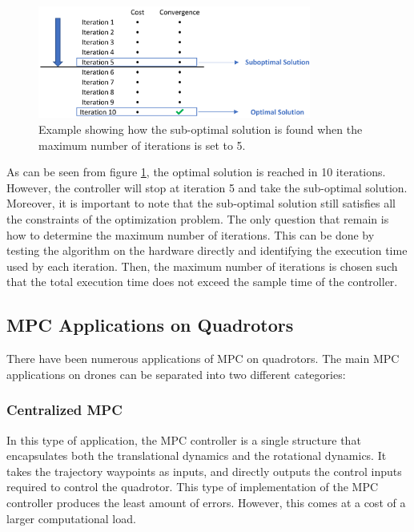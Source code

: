 \documentclass{thesisreport}
\begin{document}
\begin{figure}[h]
\centering
\includegraphics[width=0.8\textwidth]{Images/Control/Suboptimal_Solution.png}
\caption{Example showing how the sub-optimal solution is found when the maximum number of iterations is set to 5.}
\label{Suboptimal_solution_example}
\end{figure}

\noindent As can be seen from figure \ref{Suboptimal_solution_example}, the optimal solution is reached in 10 iterations. However, the controller will stop at iteration 5 and take the sub-optimal solution. Moreover, it is important to note that the sub-optimal solution still satisfies all the constraints of the optimization problem. The only question that remain is how to determine the maximum number of iterations. This can be done by testing the algorithm on the hardware directly and identifying the execution time used by each iteration. Then, the maximum number of iterations is chosen such that the total execution time does not exceed the sample time of the controller.

\subsection{MPC Applications on Quadrotors}

 There have been numerous applications of MPC on quadrotors. The main MPC applications on drones can be separated into two different categories:

\subsubsection{Centralized MPC}
 
In this type of application, the MPC controller is a single structure that encapsulates both the translational dynamics and the rotational dynamics. It takes the trajectory waypoints as inputs, and directly outputs the control inputs required to control the quadrotor. This type of implementation of the MPC controller produces the least amount of errors. However, this comes at a cost of a larger computational load.
\end{document}
